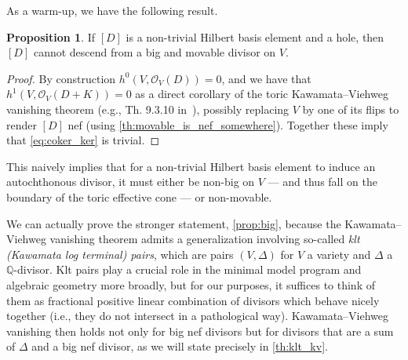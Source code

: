 \documentclass[11pt,dvipsnames]{article}
\theoremstyle{definition}
\newtheorem{prop}[theorem]{Proposition}
\begin{document}
As a warm-up, we have the following result.
\begin{prop}
    If $[D]$ is a non-trivial Hilbert basis element and a hole, then $[D]$ cannot descend from a big and movable divisor on $V$.
    \label{prop:toric_big_movable}
\end{prop}
\begin{proof}
    By construction $h^0(V, \mathcal{O}_V(D)) = 0$, and we have that $h^1(V, \mathcal{O}_V(D+K)) = 0$ as a direct corollary of the toric Kawamata--Viehweg vanishing theorem (e.g., Th. 9.3.10 in~\cite{cls}), possibly replacing $V$ by one of its flips to render $[D]$ nef (using \cref{th:movable_is_nef_somewhere}). Together these imply that \cref{eq:coker_ker} is trivial.
\end{proof}
This naively implies that for a non-trivial Hilbert basis element to induce an autochthonous divisor, it must either be non-big on $V$ --- and thus fall on the boundary of the toric effective cone --- or non-movable. 

We can actually prove the stronger statement, \cref{prop:big}, because the Kawamata--Viehweg vanishing theorem admits a generalization involving so-called \textit{klt (Kawamata log terminal) pairs}, which are pairs $(V, \Delta)$ for $V$ a variety and $\Delta$ a $\mathbb{Q}$-divisor. Klt pairs play a crucial role in the minimal model program and algebraic geometry more broadly, but for our purposes, it suffices to think of them as fractional positive linear combination of divisors which behave nicely together (i.e., they do not intersect in a pathological way). Kawamata--Viehweg vanishing then holds not only for big nef divisors but for divisors that are a sum of $\Delta$ and a big nef divisor, as we will state precisely in \cref{th:klt_kv}.
\end{document}
